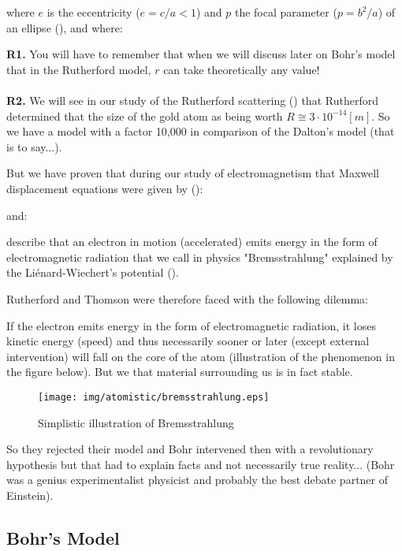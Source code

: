 where $e$ is the eccentricity ($e=c/a<1$) and $p$ the focal parameter ($p=b^2/a$) of an ellipse (), and where:
	

	\begin{tcolorbox}[title=Remark,colframe=black,arc=10pt]
\textbf{R1.} You will have to remember that when we will discuss later on Bohr's model that in the Rutherford model, $r$ can take theoretically any value!\\\\
\textbf{R2.} We will see in our study of the Rutherford scattering () that Rutherford determined that the size of the gold atom as being worth $R\cong 3\cdot 10^{-14} [m]$. So we have a model with a factor 10,000 in comparison of the Dalton's model (that is to say...).
	\end{tcolorbox}	

But we have proven that during our study of electromagnetism that Maxwell displacement equations were given by ():
	
and:
	
describe that an electron in motion (accelerated) emits energy in the form of electromagnetic radiation that we call in physics "Bremsstrahlung" explained by the Liénard-Wiechert's potential ().

Rutherford and Thomson were therefore faced with the following dilemma:

If the electron emits energy in the form of electromagnetic radiation, it loses kinetic energy (speed) and thus necessarily sooner or later (except external intervention) will fall on the core of the atom (illustration of the phenomenon in the figure below). But we that material surrounding us is in fact stable.
\begin{figure}[H]
\centering
\texttt{[image: img/atomistic/bremsstrahlung.eps]}
\caption{Simplistic illustration of Bremsstrahlung}
\end{figure}
So they rejected their model and Bohr intervened then with a revolutionary hypothesis but that had to explain facts and not necessarily true reality... (Bohr was a genius experimentalist physicist  and probably the best debate partner of Einstein).

\subsection{Bohr's Model}

